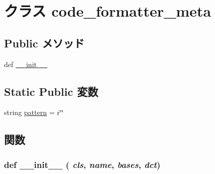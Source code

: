 \hypertarget{classm5_1_1util_1_1code__formatter_1_1code__formatter__meta}{
\section{クラス code\_\-formatter\_\-meta}
\label{classm5_1_1util_1_1code__formatter_1_1code__formatter__meta}
}
\subsection*{Public メソッド}
\begin{DoxyCompactItemize}
\item 
def \hyperlink{classm5_1_1util_1_1code__formatter_1_1code__formatter__meta_ac775ee34451fdfa742b318538164070e}{\_\-\_\-init\_\-\_\-}
\end{DoxyCompactItemize}
\subsection*{Static Public 変数}
\begin{DoxyCompactItemize}
\item 
string \hyperlink{classm5_1_1util_1_1code__formatter_1_1code__formatter__meta_a0c01909462e602acf13b5c87c07bd710}{pattern} = r\char`\"{}\char`\"{}
\end{DoxyCompactItemize}


\subsection{関数}
\hypertarget{classm5_1_1util_1_1code__formatter_1_1code__formatter__meta_ac775ee34451fdfa742b318538164070e}{
\subsubsection[{\_\-\_\-init\_\-\_\-}]{\setlength{\rightskip}{0pt plus 5cm}def \_\-\_\-init\_\-\_\- ( {\em cls}, \/   {\em name}, \/   {\em bases}, \/   {\em dct})}}
\label{classm5_1_1util_1_1code__formatter_1_1code__formatter__meta_ac775ee34451fdfa742b318538164070e}




